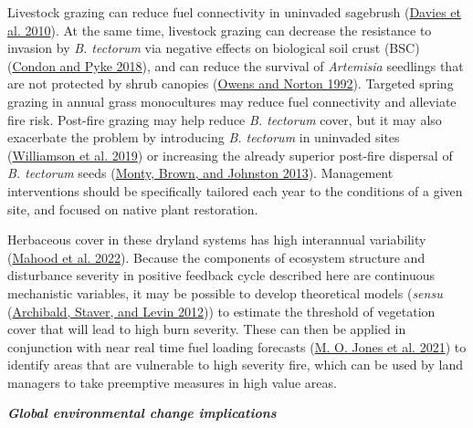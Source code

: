 \documentclass[
  12pt,
]{article}
\begin{document}
Livestock grazing can reduce fuel connectivity in uninvaded sagebrush
(\protect\hyperlink{ref-Davies2010}{Davies et al. 2010}). At the same
time, livestock grazing can decrease the resistance to invasion by
\emph{B. tectorum} via negative effects on biological soil crust (BSC)
(\protect\hyperlink{ref-Condon2018}{Condon and Pyke 2018}), and can
reduce the survival of \emph{Artemisia} seedlings that are not protected
by shrub canopies (\protect\hyperlink{ref-Owens1992}{Owens and Norton
1992}). Targeted spring grazing in annual grass monocultures may reduce
fuel connectivity and alleviate fire risk. Post-fire grazing may help
reduce \emph{B. tectorum} cover, but it may also exacerbate the problem
by introducing \emph{B. tectorum} in uninvaded sites
(\protect\hyperlink{ref-Williamson2019}{Williamson et al. 2019}) or
increasing the already superior post-fire dispersal of \emph{B.
tectorum} seeds (\protect\hyperlink{ref-Monty2013}{Monty, Brown, and
Johnston 2013}). Management interventions should be specifically
tailored each year to the conditions of a given site, and focused on
native plant restoration.

Herbaceous cover in these dryland systems has high interannual
variability (\protect\hyperlink{ref-Mahood2021}{Mahood et al. 2022}).
Because the components of ecosystem structure and disturbance severity
in positive feedback cycle described here are continuous mechanistic
variables, it may be possible to develop theoretical models
(\emph{sensu} (\protect\hyperlink{ref-Archibald2012}{Archibald, Staver,
and Levin 2012})) to estimate the threshold of vegetation cover that
will lead to high burn severity. These can then be applied in
conjunction with near real time fuel loading forecasts
(\protect\hyperlink{ref-Jones2021}{M. O. Jones et al. 2021}) to identify
areas that are vulnerable to high severity fire, which can be used by
land managers to take preemptive measures in high value areas.

\textbf{\emph{Global environmental change implications}}
\end{document}
